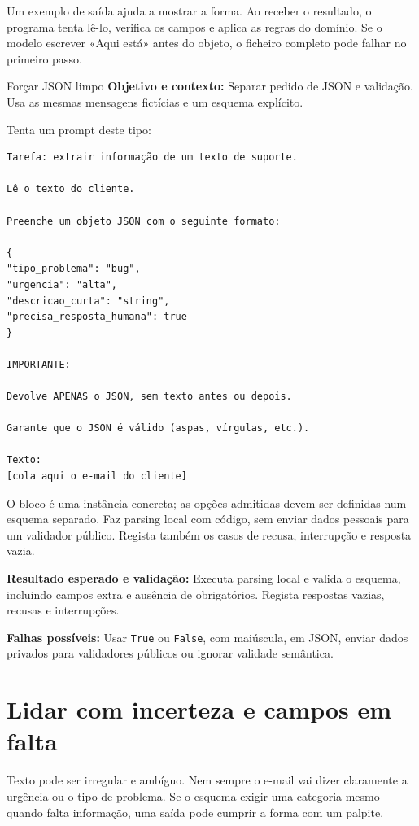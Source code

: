 Um exemplo de saída ajuda a mostrar a forma. Ao receber o resultado, o programa tenta lê-lo, verifica os campos e aplica as regras do domínio. Se o modelo escrever «Aqui está» antes do objeto, o ficheiro completo pode falhar no primeiro passo.

\begin{promptlabbox}{Forçar JSON limpo}
\textbf{Objetivo e contexto:} Separar pedido de JSON e validação. Usa as mesmas mensagens fictícias e um esquema explícito.

Tenta um prompt deste tipo:

\medskip

\begin{lstlisting}
Tarefa: extrair informação de um texto de suporte.

Lê o texto do cliente.

Preenche um objeto JSON com o seguinte formato:

{
"tipo_problema": "bug",
"urgencia": "alta",
"descricao_curta": "string",
"precisa_resposta_humana": true
}

IMPORTANTE:

Devolve APENAS o JSON, sem texto antes ou depois.

Garante que o JSON é válido (aspas, vírgulas, etc.).

Texto:
[cola aqui o e-mail do cliente]
\end{lstlisting}

O bloco é uma instância concreta; as opções admitidas devem ser definidas num esquema separado. Faz parsing local com código, sem enviar dados pessoais para um validador público. Regista também os casos de recusa, interrupção e resposta vazia.

\textbf{Resultado esperado e validação:} Executa parsing local e valida o esquema, incluindo campos extra e ausência de obrigatórios. Regista respostas vazias, recusas e interrupções.

\textbf{Falhas possíveis:} Usar \texttt{True} ou \texttt{False}, com maiúscula, em JSON, enviar dados privados para validadores públicos ou ignorar validade semântica.
\end{promptlabbox}

\section{Lidar com incerteza e campos em falta}

Texto pode ser irregular e ambíguo. Nem sempre o e-mail vai dizer claramente a urgência ou o tipo de problema. Se o esquema exigir uma categoria mesmo quando falta informação, uma saída pode cumprir a forma com um palpite.

